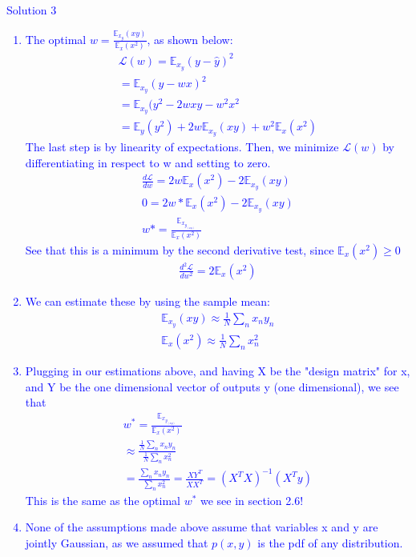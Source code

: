 \documentclass[submit]{harvardml}
\newcommand{\Lagr}{\mathcal{L}}
\begin{document}
\newpage
\textcolor{blue}{
\begin{framed}
Solution 3
\begin{enumerate}
    \item The optimal $w = \frac{\mathbb{E}_x_y(xy)}{\mathbb{E}_x(x^2)}$, as shown below:
        \begin{gather*}
            \Lagr(w) = \mathbb{E}_x_y(y-\hat{y})^2 \\
            = \mathbb{E}_x_y(y-wx)^2 \\ 
            = \mathbb{E}_x_y(y^2-2wxy-w^2x^2 \\ 
            = \mathbb{E}_y(y^2) + 2w\mathbb{E}_x_y(xy) + w^2\mathbb{E}_x(x^2)
        \end{gather*}
    The last step is by linearity of expectations. Then, we minimize $\Lagr(w)$ by differentiating in respect to w and setting to zero. 
        \begin{gather*}
            \frac{d\Lagr}{d w} = 2w\mathbb{E}_x(x^2) - 2\mathbb{E}_x_y(xy) \\
            0 = 2w*\mathbb{E}_x(x^2) - 2\mathbb{E}_x_y(xy) \\
            w* = \frac{\mathbb{E}_x_y_(xy)}{\mathbb{E}_x(x^2)}
        \end{gather*}
    See that this is a minimum by the second derivative test, since $\mathbb{E}_x(x^2) \geq 0$
        \begin{gather*}
            \frac{d^2 \Lagr}{dw^2} = 2\mathbb{E}_x(x^2)
        \end{gather*}
    \item We can estimate these by using the sample mean:
        \begin{gather*}
            \mathbb{E}_x_y(xy) \approx \frac{1}{N} \sum_n x_n y_n \\
            \mathbb{E}_x(x^2) \approx \frac{1}{N} \sum_n x_n^2
        \end{gather*}
    \item Plugging in our estimations above, and having X be the "design matrix" for x, and Y be the one dimensional vector of outputs y (one dimensional), we see that 
        \begin{gather*}
            w^* = \frac{\mathbb{E}_x_y_(xy)}{\mathbb{E}_x(x^2)} \\
            \approx \frac{\frac{1}{N} \sum_n x_n y_n}{\frac{1}{N} \sum_n x_n^2} \\
            = \frac{\sum_n x_n y_n}{\sum_n x_n^2}
            = \frac{XY^T}{XX^T}
            = (X^TX)^{-1}(X^Ty)
        \end{gather*}
        This is the same as the optimal $w^*$ we see in section 2.6!
    \item None of the assumptions made above assume that variables x and y are jointly Gaussian, as we assumed that $p(x,y)$ is the pdf of any distribution.
\end{enumerate}
\end{framed}
}
\newpage
\end{document}
